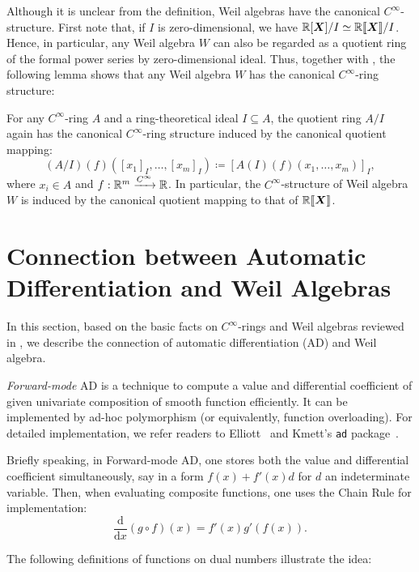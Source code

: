 Although it is unclear from the definition, Weil algebras have the canonical $C^\infty$-structure.
First note that, if $I$ is zero-dimensional, we have $\mathbb{R}[\boldsymbol{X}]/I \simeq \mathbb{R}\llbracket \boldsymbol{X} \rrbracket /I$.
Hence, in particular, any Weil algebra $W$ can also be regarded as a quotient ring of the formal power series by zero-dimensional ideal.
Thus, together with , the following lemma shows that any Weil algebra $W$ has the canonical $C^\infty$-ring structure:

\begin{lemma}\label{lem:quot-ring-ideal}
  For any $C^\infty$-ring $A$ and a ring-theoretical ideal $I \subseteq A$, the quotient ring $A/I$ again has the canonical $C^\infty$-ring structure induced by the canonical quotient mapping:
  \[
    (A/I)(f)([x_1]_I, \dots, [x_m]_I) \coloneqq \left[ A(I)(f)(x_1, \dots, x_m) \right]_I,
  \]
  where $x_i \in A$ and $f: \mathbb{R}^m \xrightarrow{C^\infty} \mathbb{R}$.
  In particular, the $C^\infty$-structure of Weil algebra $W$ is induced by the canonical quotient mapping to that of $\mathord{\mathbb{R}\llbracket\boldsymbol{X}\rrbracket}$.
\end{lemma}

\section{Connection between Automatic Differentiation and Weil Algebras}
\label{sec:ad-and-weils}
In this section, based on the basic facts on $C^\infty$-rings and Weil algebras reviewed in , we describe the connection of automatic differentiation (AD) and Weil algebra.

\emph{Forward-mode} AD is a technique to compute a value and differential coefficient of given univariate composition of smooth function efficiently.
It can be implemented by ad-hoc polymorphism (or equivalently, function overloading).
For detailed implementation, we refer readers to Elliott~\cite{Elliott2009-beautiful-differentiation} and Kmett's \texttt{ad} package~\cite{Kmett:2010aa}.

Briefly speaking, in Forward-mode AD, one stores both the value and differential coefficient simultaneously, say in a form $f(x) + f'(x) d$ for $d$ an indeterminate variable.
Then, when evaluating composite functions, one uses the Chain Rule for implementation:
\[
  \frac{\mathrm{d}}{\mathrm{d}x}(g \circ f)(x) = f'(x) g'(f(x)).
\]

The following definitions of functions on dual numbers illustrate the idea:

